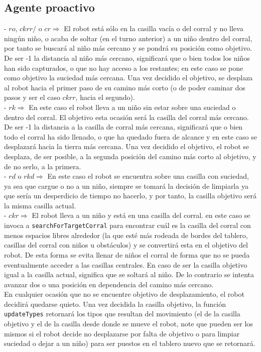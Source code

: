 \documentclass[a4paper,12pt]{article}
\def\code#1{\texttt{#1}}
\begin{document}
\subsection*{Agente proactivo}
- $ro$, $ckrr/$ o $cr \Longrightarrow$ El robot está sólo en la casilla vacía o del corral  y no lleva ningún niño, o acaba de soltar (en el turno anterior) a un niño dentro del corral, por tanto se buscará al niño más cercano y se pondrá su posición como objetivo. De ser -1 la distancia al niño más cercano, significará que o bien todos los niños han sido capturados, o que no hay acceso a los restantes; en este caso se pone como objetivo la suciedad más cercana. Una vez decidido el objetivo, se desplaza al robot hacia el primer paso de su camino más corto (o de poder caminar dos pasos y ser el caso $ckrr$, hacia el segundo).\\
- $rk \Longrightarrow$ En este caso el robot lleva a un niño sin estar sobre una suciedad o dentro del corral. El objetivo esta ocasión será la casilla del corral más cercano. De ser -1 la distancia a la casilla de corral más cercana, significará que o bien todo el corral ha sido llenado, o que ha quedado fuera de alcance y en este caso se desplazará hacia la tierra más cercana. Una vez decidido el objetivo, el robot se desplaza, de ser posible, a la segunda posición del camino más corto al objetivo, y de no serlo, a la primera.\\
- $rd$ o $rkd \Longrightarrow$ En este caso el robot se encuentra sobre una casilla con suciedad, ya sea que cargue o no a un niño, siempre se tomará la decisión de limpiarla ya que sería un desperdicio de tiempo no hacerlo, y por tanto, la casilla objetivo será la misma casilla actual.\\
- $ckr \Longrightarrow$ El robot lleva a un niño y está en una casilla del corral. en este caso se invoca a \code{searchForTargetCorral} para encontrar cuál es la casilla del corral con menos espacios libres alrededor (la que esté más rodeada de bordes del tablero, casillas del corral con niños u obstáculos) y se convertirá esta en el objetivo del robot. De esta forma se evita llenar de niños el corral de forma que no se pueda eventualmente acceder a las casillas centrales. En caso de ser la casilla objetivo igual a la casilla actual, significa que se soltará al niño. De lo contrario se intenta avanzar dos o una posición en dependencia del camino más cercano.\\

En cualquier ocasión que no se encuentre objetivo de desplazamiento, el robot decidirá quedarse quieto. Una vez decidida la casilla objetivo, la función \code{updateTypes} retornará los tipos que resultan del movimiento (el de la casilla objetivo y el de la casilla desde donde se mueve el robot, note que pueden ser los mismos si el robot decide no desplazarse por falta de objetivo o para limpiar suciedad o dejar a un niño) para ser puestos en el tablero nuevo que se retornará.
\end{document}
